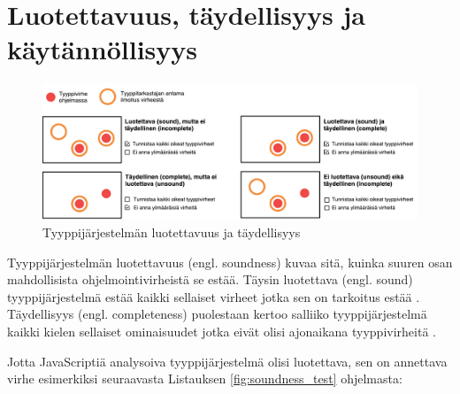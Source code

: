 \section{Luotettavuus, täydellisyys ja käytännöllisyys}
\begin{figure}[!htb]
\includegraphics[width=\textwidth]{images/soundness_completeness2.pdf}
\caption{Tyyppijärjestelmän luotettavuus ja täydellisyys}
\end{figure}

Tyyp\-pi\-jär\-jes\-tel\-män luotettavuus (engl. soundness) kuvaa sitä,
kuinka suuren osan\newline
mah\-dol\-li\-sis\-ta oh\-jel\-moin\-ti\-vir\-heis\-tä se
estää. Täysin luotettava (engl. sound) tyyppijärjestelmä estää kaikki
sellaiset virheet jotka sen on tarkoitus estää
\cite{CSE_ProgrammingLanguages}. Täydellisyys (engl. \mbox{completeness})
puolestaan kertoo salliiko tyyppijärjestelmä kaikki kielen sellaiset
ominaisuudet jotka eivät olisi ajonaikana tyyppivirheitä
\cite{TypesAndProgrammingLanguages, CSE_ProgrammingLanguages}.

Jotta JavaScriptiä analysoiva tyyppijärjestelmä olisi luotettava, sen on
annettava virhe esimerkiksi seuraavasta Listauksen \ref{fig:soundness_test} ohjelmasta:
\newline

